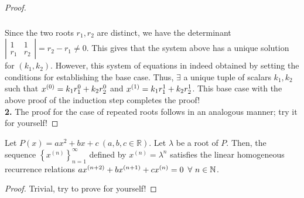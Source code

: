 \documentclass{article}
\begin{document}
\begin{proof}
\begin{align*}
\begin{array}{c}
\end{array}
\nonumber
\end{align*}
Since the two roots $r_1, r_2$ are distinct, we have the determinant 
$
    \left\lvert
    \begin{array}{cc}
        1 & 1 \\
        r_1 & r_2 
    \end{array}
    \right\rvert
    =
    r_2 - r_1
    \ne 0
$.
This gives that the system above has a unique solution for $\left(k_1, k_2\right)$.
However, this system of equations in indeed obtained by setting the conditions for establishing the base case.
Thus, $\exists$ a unique tuple of scalars $k_1, k_2$ such that ${x}^{(0)} = k_1 r_1^0 + k_2 r_2^0$ and ${x}^{(1)} = k_1 r_1^1 + k_2 r_2^1$.
This base case with the above proof of the induction step completes the proof!\\[5pt]
\textbf{2. }
The proof for the case of repeated roots follows in an analogous manner; try it for yourself!
\end{proof}

\begin{lemma}
Let $P(x) = ax^2 + bx + c\ \left(a, b, c\in\mathbb{R}\right)$.
Let $\lambda$ be a root of $P$.
Then, the sequence $\left\{x^{(n)}\right\}_{n = 1}^\infty$ defined by $x^{(n)} = \lambda^n$ satisfies the linear homogeneous recurrence relations $a\evx^{(n + 2)} + b\evx^{(n + 1)} + c\evx^{(n)} = 0\ \forall\,n\in\mathbb{N}$.
\end{lemma}
\begin{proof}
Trivial, try to prove for yourself!
\end{proof}
\end{document}
